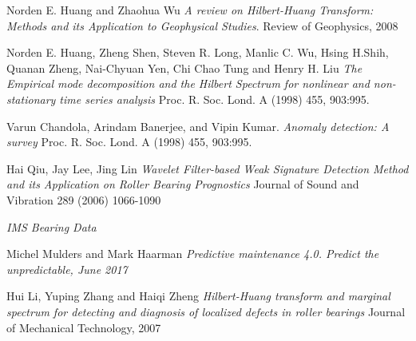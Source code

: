 \documentclass[11pt, oneside]{article}   	%
\begin{document}
\begin{thebibliography}{9}
Norden E. Huang and Zhaohua Wu 
\textit{A review on Hilbert-Huang Transform: Methods and its Application to Geophysical Studies}. 
Review of Geophysics, 2008
 
Norden E. Huang, Zheng Shen, Steven R. Long, Manlic C. Wu, Hsing H.Shih, Quanan Zheng, Nai-Chyuan Yen, Chi Chao Tung and Henry H. Liu
\textit{The Empirical mode decomposition and the Hilbert Spectrum for nonlinear and non-stationary time series analysis}
Proc. R. Soc. Lond. A (1998) 455, 903:995.

Varun Chandola, Arindam Banerjee, and Vipin Kumar.
\textit{Anomaly detection: A survey}
Proc. R. Soc. Lond. A (1998) 455, 903:995.

Hai Qiu, Jay Lee, Jing Lin
\textit{Wavelet Filter-based Weak Signature Detection Method and its Application on Roller Bearing Prognostics}
Journal of Sound and Vibration 289 (2006) 1066-1090

\textit{IMS Bearing Data}



 
Michel Mulders and Mark Haarman
\textit{Predictive maintenance 4.0. Predict the unpredictable, June 2017}

 
Hui Li, Yuping Zhang and Haiqi Zheng
\textit{Hilbert-Huang transform and marginal spectrum for detecting and diagnosis of localized defects in roller bearings}
Journal of Mechanical Technology, 2007
\end{thebibliography}
\end{document}

